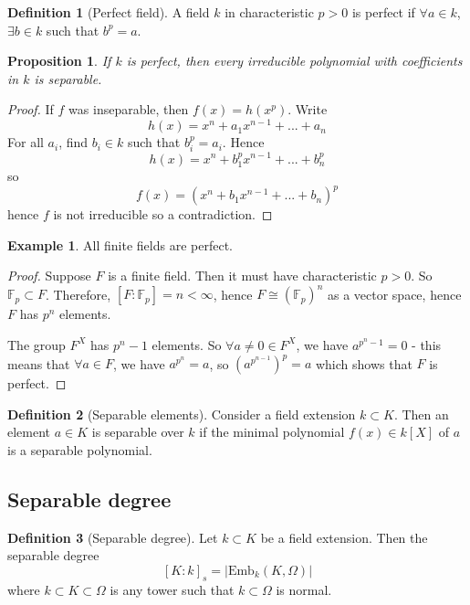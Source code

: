 \documentclass{article}
\theoremstyle{definition}
\newtheorem{defn}{Definition}[section]
\newtheorem{exmp}{Example}[section]
\theoremstyle{plain}%
\newtheorem{prop}[thm]{Proposition}
\theoremstyle{remark}
\newcommand{\Emb}{\text{Emb}}
\begin{document}
\begin{defn}[Perfect field]
A field $k$ in characteristic $p > 0$ is perfect if $\forall a \in k$, $\exists b \in k$ such that $b^p = a$.
\end{defn}

\begin{prop}
    If $k$ is perfect, then every irreducible polynomial with coefficients in $k$ is separable.
\end{prop}

\begin{proof}
    If $f$ was inseparable, then $f(x) = h(x^p)$. Write \[h(x) = x^n + a_1x^{n-1} + ... + a_n\] For all $a_i$, find $b_i \in k$ such that $b_i^p = a_i$. Hence \[h(x) = x^n + b_1^px^{n-1} + ... + b_n^p\] so \[f(x) = (x^n + b_1x^{n-1} + ... + b_n)^p\] hence $f$ is not irreducible so a contradiction.
\end{proof}

\begin{exmp}
    All finite fields are perfect.
\end{exmp}

\begin{proof}
    Suppose $F$ is a finite field. Then it must have characteristic $p > 0$. So $\mathbb{F}_p \subset F$. Therefore, $[F : \mathbb{F}_p] = n < \infty$, hence $F \cong (\mathbb{F}_p)^n$ as a vector space, hence $F$ has $p^n$ elements.
    
    The group $F^X$ has $p^n - 1$ elements. So $\forall a \ne 0 \in F^X$, we have $a^{p^n - 1} = 0$ - this means that $\forall a \in F$, we have $a^{p^n} = a$, so $(a^{p^{n-1}})^p = a$ which shows that $F$ is perfect.
\end{proof}

\begin{defn}[Separable elements]
    Consider a field extension $k \subset K$. Then an element $a \in K$ is separable over $k$ if the minimal polynomial $f(x) \in k[X]$ of $a$ is a separable polynomial.
\end{defn}

\subsection{Separable degree}

\begin{defn}[Separable degree]
    Let $k \subset K$ be a field extension. Then the separable degree
    \[ [K : k]_s = |\Emb_k(K, \Omega)| \]
    where $k \subset K \subset \Omega$ is any tower such that $k \subset \Omega$ is normal.
\end{defn}
\end{document}
